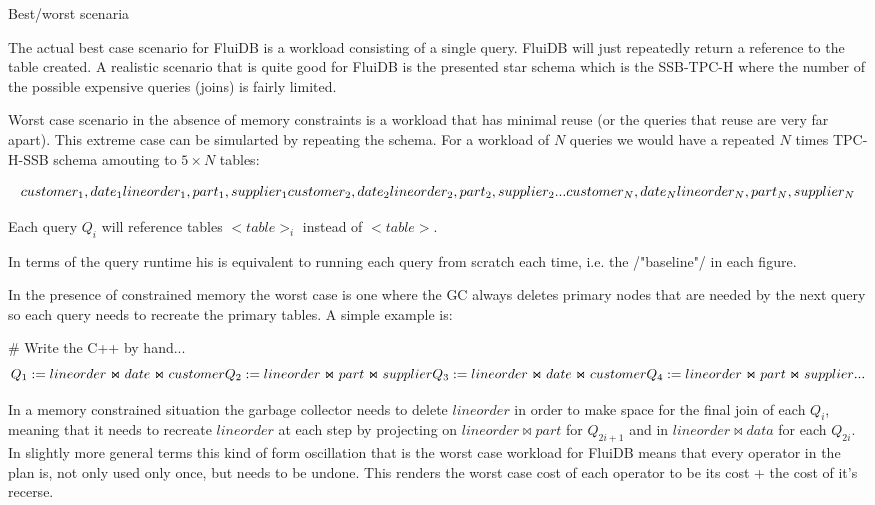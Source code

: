 \begin{contribution}{Best/worst scenaria}

The actual best case scenario for FluiDB is a workload consisting of a
single query. FluiDB will just repeatedly return a reference to the
table created. A realistic scenario that is quite good for FluiDB is
the presented star schema which is the SSB-TPC-H where the number of
the possible expensive queries (joins) is fairly limited.


Worst case scenario in the absence of memory constraints is a workload
that has minimal reuse (or the queries that reuse are very far
apart). This extreme case can be simularted by repeating the
schema. For a workload of \(N\) queries we would have a repeated \(N\)
times TPC-H-SSB schema amouting to \(5 \times N\) tables:

\[
  customer_1, date_1 lineorder_1, part_1, supplier_1 \\
  customer_2, date_2 lineorder_2, part_2, supplier_2 \\
  ... \\
  customer_N, date_N lineorder_N, part_N, supplier_N \\
\]

Each query \(Q_i\) will reference tables \(<table>_i\) instead of
\(<table>\).

In terms of the query runtime his is equivalent to running each query
from scratch each time, i.e. the /"baseline"/ in each figure.

In the presence of constrained memory the worst case is one where the
GC always deletes primary nodes that are needed by the next query so
each query needs to recreate the primary tables. A simple example is:


# Write the C++ by hand...
\[
Q_1 := lineorder \Join date \Join customer \\
Q_2 := lineorder \Join part \Join supplier \\
Q_3 := lineorder \Join date \Join customer \\
Q_4 := lineorder \Join part \Join supplier \\
...
\]

In a memory constrained situation the garbage collector needs to
delete \(lineorder\) in order to make space for the final join of each
\(Q_i\), meaning that it needs to recreate \(lineorder\) at each step
by projecting on \(lineorder \Join part\) for \(Q_{2i + 1}\) and in
\(lineorder \Join data\) for each \(Q_{2i}\). In slightly more general
terms this kind of form oscillation that is the worst case workload
for FluiDB means that every operator in the plan is, not only used
only once, but needs to be undone. This renders the worst case cost of
each operator to be its cost + the cost of it's recerse.


\end{contribution}
